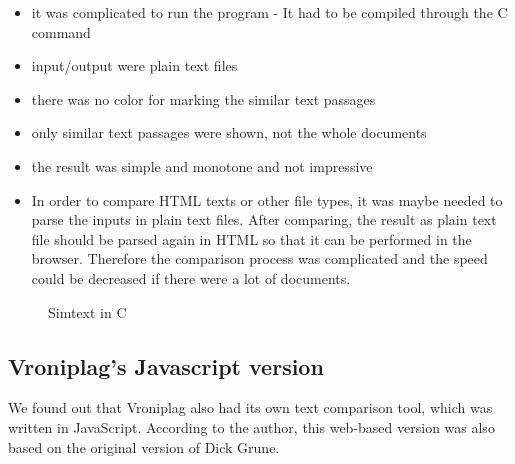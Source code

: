 \begin{itemize}
\item it was complicated to run the program  - It had to be compiled through the C command 
\item input/output were plain text files
\item there was no color for marking the similar text passages
\item only similar text passages were shown, not the whole documents
\item the result was simple and monotone and not impressive
\item In order to compare HTML texts or other file types, it  was maybe needed to parse the inputs in plain text files. After comparing, the result as plain text file should be parsed again in HTML so that it can be performed in the browser. Therefore the comparison process was complicated and the speed could be decreased if there were a lot of documents.
\end{itemize}

\begin{figure}[!h]
  \centering
  \caption{Simtext in C}
  \label{fig:Sim_in_C}
\end{figure}

\subsection{Vroniplag’s Javascript version}
We found out that Vroniplag also had its own text comparison tool, which was written in JavaScript. According to the author, this web-based version was also based on the original version of Dick Grune. %


